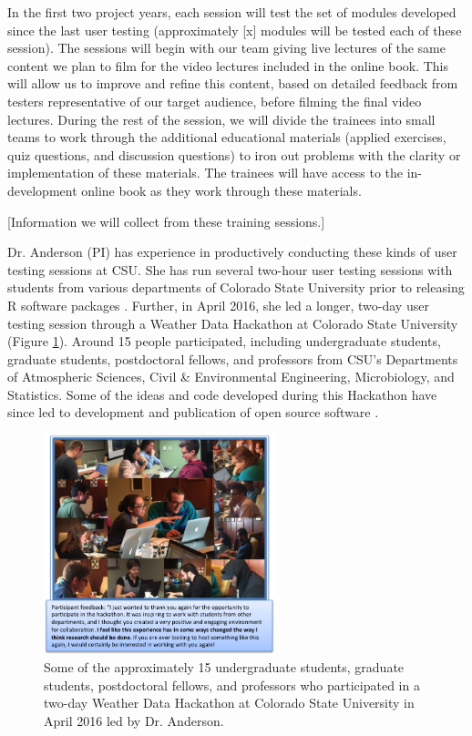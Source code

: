 \documentclass[pdftex,english,11pt,parskip=half]{scrartcl}
\begin{document}
In the first two project years, each session will test the set of modules developed since the last user testing (approximately [x] modules will be tested each of these session). The sessions will begin with our team giving live lectures of the same content we plan to film for the video lectures included in the online book. This will allow us to improve and refine this content, based on detailed feedback from testers representative of our target audience, before filming the final video lectures. During the rest of the session, we will divide the trainees into small teams to work through the additional educational materials (applied exercises, quiz questions, and discussion questions) to iron out problems with the clarity or implementation of these materials. The trainees will have access to the in-development online book as they work through these materials.

[Information we will collect from these training sessions.]

Dr. Anderson (PI) has experience in productively conducting these kinds of user testing sessions at CSU. She has run several two-hour user testing sessions with students from various departments of Colorado State University prior to releasing R software packages \cite{futureheatwaves, countyweather}. Further, in April 2016, she led a longer, two-day user testing session through a Weather Data Hackathon at Colorado State University (Figure \ref{csu-r-hackathon}). Around 15 people participated, including undergraduate students, graduate students, postdoctoral fellows, and professors from CSU's Departments of Atmospheric Sciences, Civil \& Environmental Engineering, Microbiology, and Statistics. Some of the ideas and code developed during this Hackathon have since led to development and publication of open source software \cite{countyfloods, noaastormevents}.

\begin{figure}
\centering
\includegraphics[width = 0.6\textwidth]{figures/csu_hackathon.png}
\caption{Some of the approximately 15 undergraduate students, graduate students, postdoctoral fellows, and professors who participated in a two-day Weather Data Hackathon at Colorado State University in April 2016 led by Dr. Anderson.}
\label{csu-r-hackathon} 
\end{figure}
\end{document}
